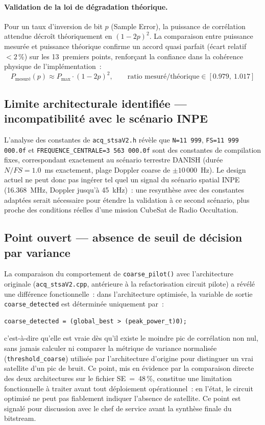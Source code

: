 \documentclass[11pt,a4paper]{article}
\begin{document}
\paragraph{Validation de la loi de dégradation théorique.} Pour un taux d'inversion de bit $p$ (Sample Error), la puissance de corrélation attendue décroît théoriquement en $(1-2p)^2$. La comparaison entre puissance mesurée et puissance théorique confirme un accord quasi parfait (écart relatif $<2\,\%$) sur les 13~premiers points, renforçant la confiance dans la cohérence physique de l'implémentation~:
\begin{equation}
P_{\text{mesuré}}(p) \approx P_{\text{max}} \cdot (1-2p)^2, \qquad \text{ratio mesuré/théorique} \in [0.979,\ 1.017]
\end{equation}

\subsection{Limite architecturale identifiée --- incompatibilité avec le scénario INPE}
\label{sec:limite-inpe}

L'analyse des constantes de \texttt{acq\_stsaV2.h} révèle que \texttt{N=11\,999}, \texttt{FS=11\,999\,000.0f} et \texttt{FREQUENCE\_CENTRALE=3\,563\,000.0f} sont des constantes de compilation fixes, correspondant exactement au scénario terrestre DANISH (durée $N/FS = 1.0$~ms exactement, plage Doppler coarse de $\pm10\,000$~Hz). Le design actuel ne peut donc pas ingérer tel quel un signal du scénario spatial INPE (16.368~MHz, Doppler jusqu'à 45~kHz)~: une resynthèse avec des constantes adaptées serait nécessaire pour étendre la validation à ce second scénario, plus proche des conditions réelles d'une mission CubeSat de Radio Occultation.

\subsection{Point ouvert --- absence de seuil de décision par variance}
\label{sec:point-ouvert-variance}

La comparaison du comportement de \texttt{coarse\_pilot()} avec l'architecture originale (\texttt{acq\_stsaV2.cpp}, antérieure à la refactorisation circuit pilote) a révélé une différence fonctionnelle~: dans l'architecture optimisée, la variable de sortie \texttt{coarse\_detected} est déterminée uniquement par~:
\begin{lstlisting}[numbers=none]
coarse_detected = (global_best > (peak_power_t)0);
\end{lstlisting}
c'est-à-dire qu'elle est vraie dès qu'il existe le moindre pic de corrélation non nul, sans jamais calculer ni comparer la métrique de variance normalisée (\texttt{threshold\_coarse}) utilisée par l'architecture d'origine pour distinguer un vrai satellite d'un pic de bruit. Ce point, mis en évidence par la comparaison directe des deux architectures sur le fichier SE~=~48\,\%, constitue une limitation fonctionnelle à traiter avant tout déploiement opérationnel~: en l'état, le circuit optimisé ne peut pas fiablement indiquer l'absence de satellite. Ce point est signalé pour discussion avec le chef de service avant la synthèse finale du bitstream.
\end{document}
